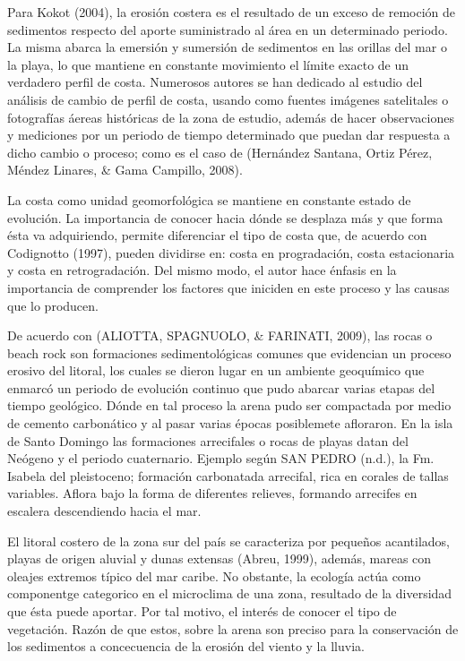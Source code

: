 \documentclass[11pt,]{article}
\begin{document}
Para Kokot (2004), la erosión costera es el resultado de un exceso de
remoción de sedimentos respecto del aporte suministrado al área en un
determinado periodo. La misma abarca la emersión y sumersión de
sedimentos en las orillas del mar o la playa, lo que mantiene en
constante movimiento el límite exacto de un verdadero perfil de costa.
Numerosos autores se han dedicado al estudio del análisis de cambio de
perfil de costa, usando como fuentes imágenes satelitales o fotografías
áereas históricas de la zona de estudio, además de hacer observaciones y
mediciones por un periodo de tiempo determinado que puedan dar respuesta
a dicho cambio o proceso; como es el caso de (Hernández Santana, Ortiz
Pérez, Méndez Linares, \& Gama Campillo, 2008).

La costa como unidad geomorfológica se mantiene en constante estado de
evolución. La importancia de conocer hacia dónde se desplaza más y que
forma ésta va adquiriendo, permite diferenciar el tipo de costa que, de
acuerdo con Codignotto (1997), pueden dividirse en: costa en
progradación, costa estacionaria y costa en retrogradación. Del mismo
modo, el autor hace énfasis en la importancia de comprender los factores
que iniciden en este proceso y las causas que lo producen.

De acuerdo con (ALIOTTA, SPAGNUOLO, \& FARINATI, 2009), las rocas o
beach rock son formaciones sedimentológicas comunes que evidencian un
proceso erosivo del litoral, los cuales se dieron lugar en un ambiente
geoquímico que enmarcó un periodo de evolución continuo que pudo abarcar
varias etapas del tiempo geológico. Dónde en tal proceso la arena pudo
ser compactada por medio de cemento carbonático y al pasar varias épocas
posiblemete afloraron. En la isla de Santo Domingo las formaciones
arrecifales o rocas de playas datan del Neógeno y el periodo
cuaternario. Ejemplo según SAN PEDRO (n.d.), la Fm. Isabela del
pleistoceno; formación carbonatada arrecifal, rica en corales de tallas
variables. Aflora bajo la forma de diferentes relieves, formando
arrecifes en escalera descendiendo hacia el mar.

El litoral costero de la zona sur del país se caracteriza por pequeños
acantilados, playas de origen aluvial y dunas extensas (Abreu, 1999),
además, mareas con oleajes extremos típico del mar caribe. No obstante,
la ecología actúa como componentge categorico en el microclima de una
zona, resultado de la diversidad que ésta puede aportar. Por tal motivo,
el interés de conocer el tipo de vegetación. Razón de que estos, sobre
la arena son preciso para la conservación de los sedimentos a
concecuencia de la erosión del viento y la lluvia.
\end{document}
